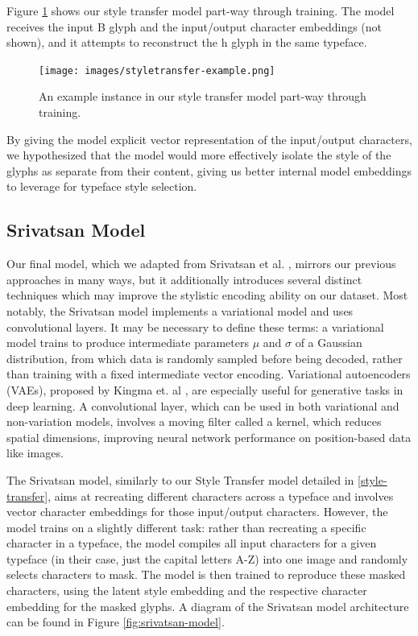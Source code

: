 Figure \ref{fig:styletransfer-example} shows our style transfer model part-way through training. The model receives the input { B} glyph and the input/output character embeddings (not shown), and it attempts to reconstruct the { h} glyph in the same typeface.

\begin{figure}[h]
    \centering
    \texttt{[image: images/styletransfer-example.png]}
    \caption{An example instance in our style transfer model part-way through training.}
    \label{fig:styletransfer-example}
\end{figure}

By giving the model explicit vector representation of the input/output characters, we hypothesized that the model would more effectively isolate the style of the glyphs as separate from their content, giving us better internal model embeddings to leverage for typeface style selection.

\subsection{Srivatsan Model}

Our final model, which we adapted from Srivatsan et al. \cite{srivatsan2020}, mirrors our previous approaches in many ways, but it additionally introduces several distinct techniques which may improve the stylistic encoding ability on our dataset. Most notably, the Srivatsan model implements a variational model and uses convolutional layers. It may be necessary to define these terms: a variational model trains to produce intermediate parameters $\mu$ and $\sigma$ of a Gaussian distribution, from which data is randomly sampled before being decoded, rather than training with a fixed intermediate vector encoding. Variational autoencoders (VAEs), proposed by Kingma et. al \cite{kingma2019}, are especially useful for generative tasks in deep learning. A convolutional layer, which can be used in both variational and non-variation models, involves a moving filter called a kernel, which reduces spatial dimensions, improving neural network performance on position-based data like images.

The Srivatsan model, similarly to our Style Transfer model detailed in \ref{style-transfer}, aims at recreating different characters across a typeface and involves vector character embeddings for those input/output characters. However, the model trains on a slightly different task: rather than recreating a specific character in a typeface, the model compiles all input characters for a given typeface (in their case, just the capital letters A-Z) into one image and randomly selects characters to mask. The model is then trained to reproduce these masked characters, using the latent style embedding and the respective character embedding for the masked glyphs. A diagram of the Srivatsan model architecture can be found in Figure \ref{fig:srivatsan-model}.


